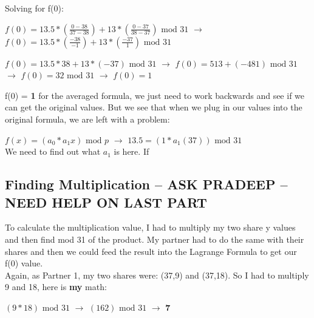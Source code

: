\documentclass[10pt]{article}
\begin{document}
\noindent Solving for f(0):\\ \vspace{0.1in}

$f(0) = 13.5*\left(\frac{0 - 38}{37 - 38}\right) + 13*\left(\frac{0 - 37}{38 - 37}\right) \textrm{ mod } 31$
$\rightarrow$
$f(0) = 13.5*\left(\frac{-38}{-1}\right) + 13*\left(\frac{-37}{1}\right)  \textrm{ mod } 31$
\vspace{0.1in}

$f(0) = 13.5*38 + 13*(-37)  \textrm{ mod } 31$
$\rightarrow$
$f(0) = 513 + (-481)  \textrm{ mod } 31$
$\rightarrow$
$f(0) = 32  \textrm{ mod } 31$
$\rightarrow$
$f(0) = 1$

\vspace{0.1in}
\noindent f(0) = \textbf{1} for the averaged formula, we just need to work backwards and see if we can get the original values. 
But we see that when we plug in our values into the original formula, we are left with a problem: \\ \vspace{0.1in}

$f(x) = (a_0 * a_1x) \textrm{ mod } p$ 
$\rightarrow$
$13.5 = (1 * a_1(37)) \textrm{ mod } 31$ \\

\noindent We need to find out what $a_1$ is here. If 






\vspace{0.2in}
\subsection{Finding Multiplication -- ASK PRADEEP -- NEED HELP ON LAST PART}
\noindent To calculate the multiplication value, I had to multiply my two share y values and then find mod 31 of the product. My partner had to do the same with their shares and then we could feed the result into the Lagrange Formula to get our f(0) value.\\
Again, as Partner 1, my two shares were: (37,9) and (37,18). 
So I had to multiply 9 and 18, here is \textbf{my} math:\\ \vspace{0.1in}

$\left(9*18\right) \textrm{ mod } 31$ $\rightarrow$
$\left(162\right) \textrm{ mod } 31$ $\rightarrow$ \textbf{7}\\
\newline
\end{document}

